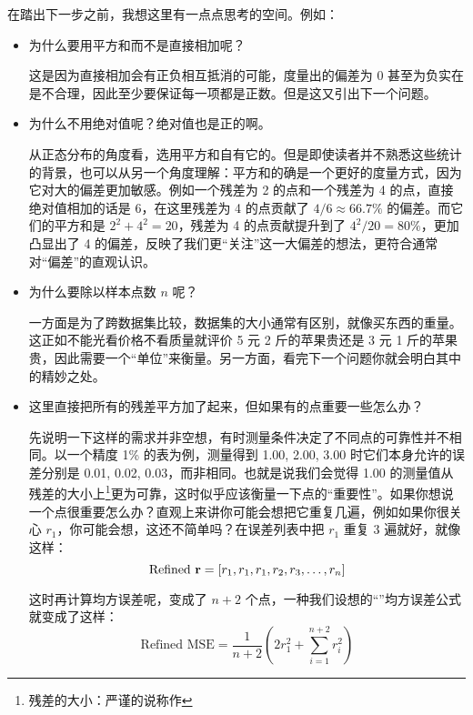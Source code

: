 在踏出下一步之前，我想这里有一点点思考的空间。例如：
\begin{itemize}
    \item 为什么要用平方和而不是直接相加呢？

          这是因为直接相加会有正负相互抵消的可能，度量出的偏差为 0 甚至为负实在是不合理，因此至少要保证每一项都是正数。但是这又引出下一个问题。

    \item 为什么不用绝对值呢？绝对值也是正的啊。

          从正态分布的角度看，选用平方和自有它的。但是即使读者并不熟悉这些统计的背景，也可以从另一个角度理解：平方和的确是一个更好的度量方式，因为它对大的偏差更加敏感。例如一个残差为 2 的点和一个残差为 4 的点，直接绝对值相加的话是 6，在这里残差为 4 的点贡献了 $4 / 6 \approx 66.7\%$ 的偏差。而它们的平方和是 $2^2 + 4^2 = 20$，残差为 4 的点贡献提升到了 $4^2 / 20 = 80\%$，更加凸显出了 4 的偏差，反映了我们更“关注”这一大偏差的想法，更符合通常对“偏差”的直观认识。

    \item 为什么要除以样本点数 $n$ 呢？

          一方面是为了跨数据集比较，数据集的大小通常有区别，就像买东西的重量。这正如不能光看价格不看质量就评价 5 元 2 斤的苹果贵还是 3 元 1 斤的苹果贵，因此需要一个“单位”来衡量。另一方面，看完下一个问题你就会明白其中的精妙之处。

    \item 这里直接把所有的残差平方加了起来，但如果有的点重要一些怎么办？

          先说明一下这样的需求并非空想，有时测量条件决定了不同点的可靠性并不相同。以一个精度 1\% 的表为例，测量得到 1.00, 2.00, 3.00 时它们本身允许的误差分别是 0.01, 0.02, 0.03，而非相同。也就是说我们会觉得 1.00 的测量值从残差的大小上\footnote{残差的大小：严谨的说称作}更为可靠，这时似乎应该衡量一下点的“重要性”。如果你想说一个点很重要怎么办？直观上来讲你可能会想把它重复几遍，例如如果你很关心 $r_1$，你可能会想，这还不简单吗？在误差列表中把 $r_1$ 重复 3 遍就好，就像这样：
          \[
              \text{Refined }{\mathbf{r}} = [r_1, r_1, r_1, r_2, r_3, \ldots, r_n]
          \]

          这时再计算均方误差呢，变成了 $n+2$ 个点，一种我们设想的“”均方误差公式就变成了这样：
          \[
              \text{Refined MSE} = \frac1{n+2} \left(2r_1^2 + \sum_{i=1}^{n+2} r_i^2\right)
          \]


\end{itemize}

